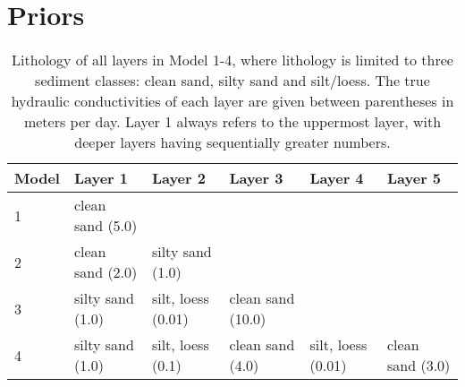 \section{Priors}

\begin{table*}[htb]
\caption{Lithology of all layers in Model 1-4, where lithology is limited to three sediment classes: clean sand, silty sand and silt/loess. The true hydraulic conductivities of each layer are given between parentheses in meters per day. Layer 1
always refers to the uppermost layer, with deeper layers having sequentially greater numbers.}
\label{tab_priors_lithology}
\begin{tabularx}{\textwidth}{llllll}
\toprule
Model & Layer 1 & Layer 2 & Layer 3 & Layer 4 & Layer 5 \\
\midrule
1 & clean sand (5.0) & & & & \\
2 & clean sand (2.0) & silty sand (1.0) & & & \\
3 & silty sand (1.0) & silt, loess (0.01) & clean sand (10.0) & & \\
4 & silty sand (1.0) & silt, loess (0.1) & clean sand (4.0) & silt, loess (0.01) & clean sand (3.0) \\
\bottomrule
\end{tabularx}
\end{table*}



